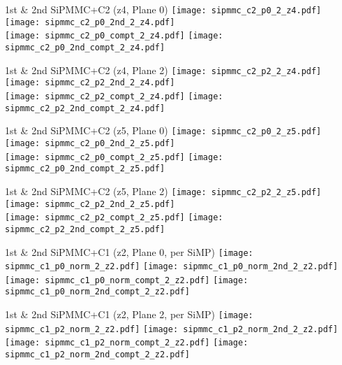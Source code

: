 \documentclass{beamer}
\begin{document}
\begin{frame}{1st \& 2nd SiPMMC+C2 (z4, Plane 0)}
	\texttt{[image: sipmmc\_c2\_p0\_2\_z4.pdf]}
	\texttt{[image: sipmmc\_c2\_p0\_2nd\_2\_z4.pdf]} \\
	
		\texttt{[image: sipmmc\_c2\_p0\_compt\_2\_z4.pdf]}
		\texttt{[image: sipmmc\_c2\_p0\_2nd\_compt\_2\_z4.pdf]}
\end{frame}

\begin{frame}{1st \& 2nd SiPMMC+C2 (z4, Plane 2)}
	\texttt{[image: sipmmc\_c2\_p2\_2\_z4.pdf]}
	\texttt{[image: sipmmc\_c2\_p2\_2nd\_2\_z4.pdf]} \\
	
		\texttt{[image: sipmmc\_c2\_p2\_compt\_2\_z4.pdf]}
		\texttt{[image: sipmmc\_c2\_p2\_2nd\_compt\_2\_z4.pdf]} 
\end{frame}

\begin{frame}{1st \& 2nd SiPMMC+C2 (z5, Plane 0)}
	\texttt{[image: sipmmc\_c2\_p0\_2\_z5.pdf]}
	\texttt{[image: sipmmc\_c2\_p0\_2nd\_2\_z5.pdf]} \\
	
		\texttt{[image: sipmmc\_c2\_p0\_compt\_2\_z5.pdf]}
		\texttt{[image: sipmmc\_c2\_p0\_2nd\_compt\_2\_z5.pdf]}
\end{frame}

\begin{frame}{1st \& 2nd SiPMMC+C2 (z5, Plane 2)}
	\texttt{[image: sipmmc\_c2\_p2\_2\_z5.pdf]}
	\texttt{[image: sipmmc\_c2\_p2\_2nd\_2\_z5.pdf]} \\
	
		\texttt{[image: sipmmc\_c2\_p2\_compt\_2\_z5.pdf]}
		\texttt{[image: sipmmc\_c2\_p2\_2nd\_compt\_2\_z5.pdf]}
\end{frame}

\begin{frame}{1st \& 2nd SiPMMC+C1 (z2, Plane 0, per SiMP)}
	\texttt{[image: sipmmc\_c1\_p0\_norm\_2\_z2.pdf]}
	\texttt{[image: sipmmc\_c1\_p0\_norm\_2nd\_2\_z2.pdf]} \\
	
		\texttt{[image: sipmmc\_c1\_p0\_norm\_compt\_2\_z2.pdf]}
		\texttt{[image: sipmmc\_c1\_p0\_norm\_2nd\_compt\_2\_z2.pdf]}
\end{frame}

\begin{frame}{1st \& 2nd SiPMMC+C1 (z2, Plane 2, per SiMP)}
	\texttt{[image: sipmmc\_c1\_p2\_norm\_2\_z2.pdf]}
	\texttt{[image: sipmmc\_c1\_p2\_norm\_2nd\_2\_z2.pdf]} \\
	
		\texttt{[image: sipmmc\_c1\_p2\_norm\_compt\_2\_z2.pdf]}
		\texttt{[image: sipmmc\_c1\_p2\_norm\_2nd\_compt\_2\_z2.pdf]}
\end{frame}
\end{document}
